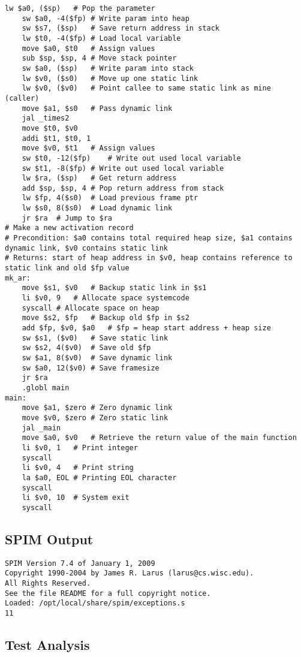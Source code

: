 \begin{lstlisting}[showstringspaces=false,breaklines=true,backgroundcolor=\color{light-gray}, captionpos=b]
	lw $a0, ($sp)	# Pop the parameter
	sw $a0, -4($fp)	# Write param into heap
	sw $s7, ($sp)	# Save return address in stack
	lw $t0, -4($fp)	# Load local variable
	move $a0, $t0	# Assign values
	sub $sp, $sp, 4	# Move stack pointer
	sw $a0, ($sp)	# Write param into stack
	lw $v0, ($s0)	# Move up one static link
	lw $v0, ($v0)	# Point callee to same static link as mine (caller)
	move $a1, $s0	# Pass dynamic link
	jal _times2
	move $t0, $v0
	addi $t1, $t0, 1
	move $v0, $t1	# Assign values
	sw $t0, -12($fp)	# Write out used local variable
	sw $t1, -8($fp)	# Write out used local variable
	lw $ra, ($sp)	# Get return address
	add $sp, $sp, 4	# Pop return address from stack
	lw $fp, 4($s0)	# Load previous frame ptr
	lw $s0, 8($s0)	# Load dynamic link
	jr $ra	# Jump to $ra
# Make a new activation record
# Precondition: $a0 contains total required heap size, $a1 contains dynamic link, $v0 contains static link
# Returns: start of heap address in $v0, heap contains reference to static link and old $fp value
mk_ar:
	move $s1, $v0	# Backup static link in $s1
	li $v0, 9	# Allocate space systemcode
	syscall	# Allocate space on heap
	move $s2, $fp	# Backup old $fp in $s2
	add $fp, $v0, $a0	# $fp = heap start address + heap size
	sw $s1, ($v0)	# Save static link
	sw $s2, 4($v0)	# Save old $fp
	sw $a1, 8($v0)	# Save dynamic link
	sw $a0, 12($v0)	# Save framesize
	jr $ra
	.globl main
main:
	move $a1, $zero	# Zero dynamic link
	move $v0, $zero	# Zero static link
	jal _main
	move $a0, $v0	# Retrieve the return value of the main function
	li $v0, 1	# Print integer
	syscall
	li $v0, 4	# Print string
	la $a0, EOL	# Printing EOL character
	syscall
	li $v0, 10	# System exit
	syscall

\end{lstlisting}\subsection{SPIM Output}
\begin{verbatim}
SPIM Version 7.4 of January 1, 2009
Copyright 1990-2004 by James R. Larus (larus@cs.wisc.edu).
All Rights Reserved.
See the file README for a full copyright notice.
Loaded: /opt/local/share/spim/exceptions.s
11
\end{verbatim}\subsection{Test Analysis}

